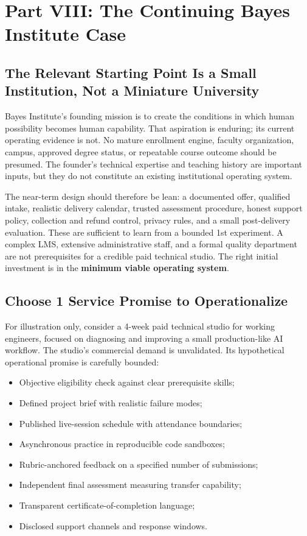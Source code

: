 \section*{Part VIII: The Continuing Bayes Institute Case}

\subsection{The Relevant Starting Point Is a Small Institution, Not a Miniature University}
\label{sec:bayes_starting_reality}

Bayes Institute's founding mission is to create the conditions in which human possibility becomes human capability. That aspiration is enduring; its current operating evidence is not. No mature enrollment engine, faculty organization, campus, approved degree status, or repeatable course outcome should be presumed. The founder's technical expertise and teaching history are important inputs, but they do not constitute an existing institutional operating system.

The near-term design should therefore be lean: a documented offer, qualified intake, realistic delivery calendar, trusted assessment procedure, honest support policy, collection and refund control, privacy rules, and a small post-delivery evaluation. These are sufficient to learn from a bounded 1st experiment. A complex LMS, extensive administrative staff, and a formal quality department are not prerequisites for a credible paid technical studio. The right initial investment is in the \textbf{minimum viable operating system}.

\subsection{Choose 1 Service Promise to Operationalize}
\label{sec:bayes_service_promise}

For illustration only, consider a 4-week paid technical studio for working engineers, focused on diagnosing and improving a small production-like AI workflow. The studio's commercial demand is unvalidated. Its hypothetical operational promise is carefully bounded:
\begin{itemize}
    \item Objective eligibility check against clear prerequisite skills;
    \item Defined project brief with realistic failure modes;
    \item Published live-session schedule with attendance boundaries;
    \item Asynchronous practice in reproducible code sandboxes;
    \item Rubric-anchored feedback on a specified number of submissions;
    \item Independent final assessment measuring transfer capability;
    \item Transparent certificate-of-completion language;
    \item Disclosed support channels and response windows.
\end{itemize}

